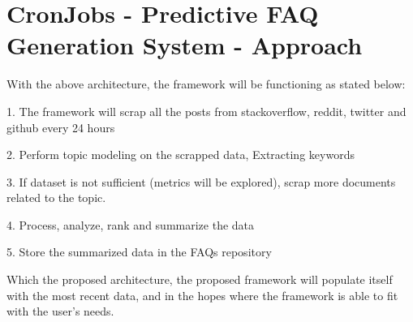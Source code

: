 \section{CronJobs - Predictive FAQ Generation System - Approach}
With the above architecture, the framework will be functioning as stated below:

1. The framework will scrap all the posts from stackoverflow, reddit, twitter and github every 24 hours

2. Perform topic modeling on the scrapped data, Extracting keywords

3. If dataset is not sufficient (metrics will be explored), scrap more documents related to the topic. 

4. Process, analyze, rank and summarize the data 

5. Store the summarized data in the FAQs repository

Which the proposed architecture, the proposed framework will populate itself with the most recent data, and in the hopes where the framework is able to fit with the user's needs.